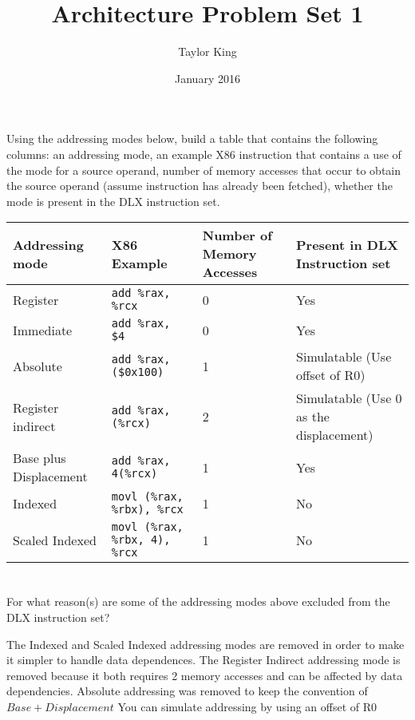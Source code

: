 \documentclass{article}
\title{Architecture Problem Set 1}
\author{Taylor King }
\date{January 2016}
\begin{document}
\maketitle

\section{}
Using the addressing modes below, build a table that contains the following columns: an addressing mode, an example X86 instruction that contains a use of the mode for a source operand, number of memory accesses that occur to obtain the source operand (assume instruction has already been fetched), whether the mode is present in the DLX instruction set.
\vspace{5mm}


\begin{tabular}{|p{3cm}|p{3cm}|p{3cm}|p{3cm}|}
    \hline
    Addressing mode & X86 Example & Number of Memory Accesses & Present in DLX Instruction set \\
    \hline
    Register & \texttt{add \%rax, \%rcx} & 0 & Yes \\
    Immediate & \texttt{add \%rax, \$4} & 0 & Yes \\
    Absolute & \texttt{add \%rax, (\$0x100)} & 1 & Simulatable (Use offset of R0) \\
    Register indirect & \texttt{add \%rax, (\%rcx)} & 2 & Simulatable (Use 0 as the displacement) \\ 
    Base plus Displacement & \texttt{add \%rax, 4(\%rcx)} & 1 & Yes\\ 
    Indexed & \texttt{movl (\%rax, \%rbx), \%rcx} & 1 & No \\ 
    Scaled Indexed & \texttt{movl (\%rax, \%rbx, 4), \%rcx} & 1 & No \\
    \hline
\end{tabular}
\vspace{5mm}
\section{} 
For what reason(s) are some of the addressing modes above excluded from the DLX instruction set?\\
\vspace{5mm}

The Indexed and Scaled Indexed addressing modes are removed in order to make it simpler to handle data dependences. The Register Indirect addressing mode is removed because it both requires 2 memory accesses and can be affected by data dependencies. Absolute addressing was removed to keep the convention of $Base + Displacement$ You can simulate addressing by using an offset of R0
\pagebreak
\end{document}
